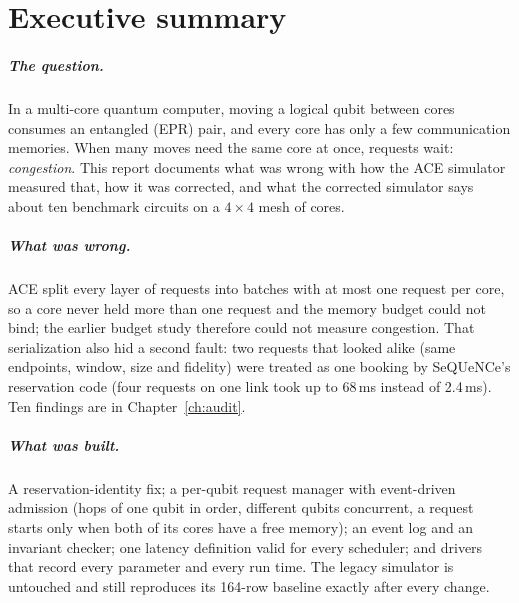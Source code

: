 \chapter*{Executive summary}

\paragraph{The question.} In a multi-core quantum computer, moving a logical qubit between cores consumes an entangled (EPR) pair, and every core has only a few
communication memories. When many moves need the same core at once, requests wait: \emph{congestion}. This report documents what was wrong with how the ACE simulator measured that,
how it was corrected, and what the corrected simulator says about ten benchmark circuits on a $4\times4$ mesh of cores.

\paragraph{What was wrong.} ACE split every layer of requests into batches with at most one request per core, so a core never held more than one request and the memory budget could not bind;
the earlier budget study therefore could not measure congestion. That serialization also hid a second fault: two requests that looked alike (same endpoints, window, size and fidelity) were treated as one booking
by SeQUeNCe's reservation code (four requests on one link took up to 68\,ms instead of 2.4\,ms). Ten findings are in Chapter~\ref{ch:audit}.

\paragraph{What was built.} A reservation-identity fix; a per-qubit request manager with event-driven admission (hops of one qubit in order, different qubits concurrent, a request starts only when both of
its cores have a free memory); an event log and an invariant checker; one latency definition valid for every scheduler; and drivers that record every parameter and every run time.
The legacy simulator is untouched and still reproduces its 164-row baseline exactly after every change.


